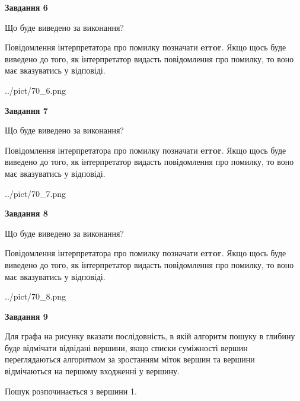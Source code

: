 \documentclass[12pt, ukrainian]{article}
\begin{document}
{\begin {large}
{\begin {center}\textbf{Завдання 6}\end {center}}\par
Що буде виведено за виконання?

Повідомлення інтерпретатора про помилку позначати \textbf{error}.
Якщо щось буде виведено до того, як інтерпретатор видасть повідомлення про помилку, 
то воно має вказуватись у відповіді. \par


\begin{center}
	{../pict/70_6.png}
\end{center}
\newpage

{\begin {center}\textbf{Завдання 7}\end {center}}\par
Що буде виведено за виконання?

Повідомлення інтерпретатора про помилку позначати \textbf{error}.
Якщо щось буде виведено до того, як інтерпретатор видасть повідомлення про помилку, 
то воно має вказуватись у відповіді. \par


\begin{center}
	{../pict/70_7.png}
\end{center}
\newpage

{\begin {center}\textbf{Завдання 8}\end {center}}\par
Що буде виведено за виконання?

Повідомлення інтерпретатора про помилку позначати \textbf{error}.
Якщо щось буде виведено до того, як інтерпретатор видасть повідомлення про помилку, 
то воно має вказуватись у відповіді. \par


\begin{center}
	{../pict/70_8.png}
\end{center}
\newpage

{\begin {center}\textbf{Завдання 9}\end {center}}\par
Для графа на рисунку вказати послідовність, в якій алгоритм пошуку в глибину буде відмічати відвідані вершини, якщо списки суміжності вершин переглядаються алгоритмом за зростанням міток вершин та вершини відмічаються на першому вход\-женні у вершину.\par
Пошук розпочинається з вершини 1.\par


\end{large}}
\end{document}
